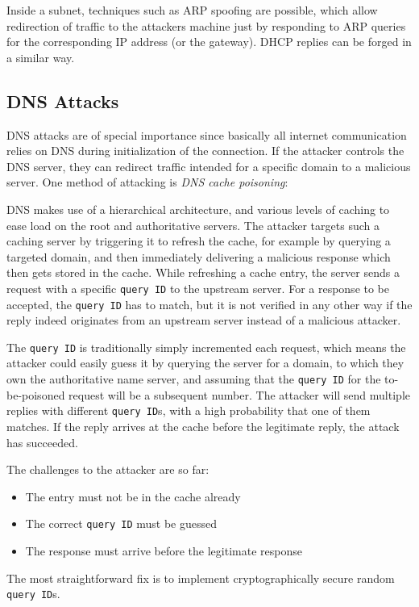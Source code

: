 Inside a subnet, techniques such as ARP spoofing are possible, which allow
redirection of traffic to the attackers machine just by responding to ARP
queries for the corresponding IP address (or the gateway). DHCP replies can be
forged in a similar way.

\subsection{DNS Attacks}
DNS attacks are of special importance since basically all internet communication
relies on DNS during initialization of the connection. If the attacker controls
the DNS server, they can redirect traffic intended for a specific domain to a
malicious server. One method of attacking is \emph{DNS cache poisoning}:

DNS makes use of a hierarchical architecture, and various levels of caching to
ease load on the root and authoritative servers. The attacker targets such a
caching server by triggering it to refresh the cache, for example by querying a
targeted domain, and then immediately delivering a malicious response which then
gets stored in the cache. While refreshing a cache entry, the server sends a
request with a specific \texttt{query ID} to the upstream server. For a response
to be accepted, the \texttt{query ID} has to match, but it is not verified in
any other way if the reply indeed originates from an upstream server instead of
a malicious attacker.

The \texttt{query ID} is traditionally simply incremented each request, which
means the attacker could easily guess it by querying the server for a domain, to
which they own the authoritative name server, and assuming that the
\texttt{query ID} for the to-be-poisoned request will be a subsequent number.
The attacker will send multiple replies with different \texttt{query ID}s, with
a high probability that one of them matches. If the reply arrives at the cache
before the legitimate reply, the attack has succeeded.

The challenges to the attacker are so far:
\begin{itemize}
    \item The entry must not be in the cache already
    \item The correct \texttt{query ID} must be guessed
    \item The response must arrive before the legitimate response
\end{itemize}

The most straightforward fix is to implement cryptographically secure random
\texttt{query ID}s.

